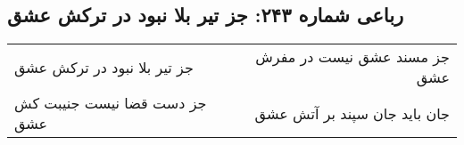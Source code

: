 \begin{center}
\section*{رباعی شماره ۲۴۳: جز تیر بلا نبود در ترکش عشق}
\label{sec:sh243}
\begin{longtable}{l p{0.5cm} r}
جز تیر بلا نبود در ترکش عشق
&&
جز مسند عشق نیست در مفرش عشق
\\
جز دست قضا نیست جنیبت کش عشق
&&
جان باید جان سپند بر آتش عشق
\\
\end{longtable}
\end{center}
